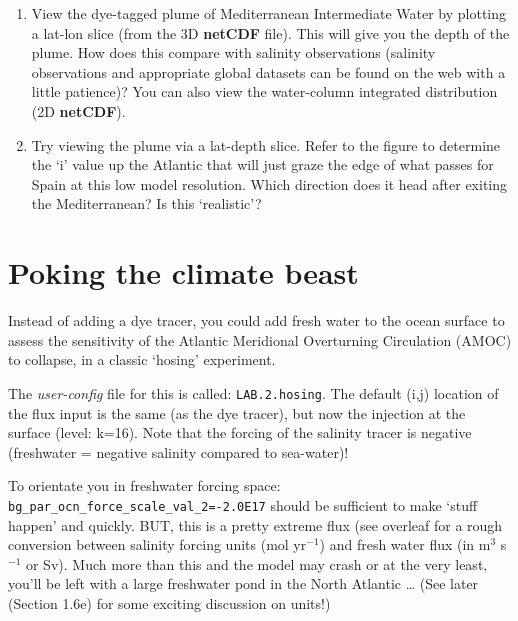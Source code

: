 \documentclass[11pt,fleqn]{book} %
\begin{document}
\vspace{1mm}
\begin{enumerate}[noitemsep]
\vspace{1mm}
\item View the dye-tagged plume of Mediterranean Intermediate Water by plotting a lat-lon slice (from the 3D \textbf{netCDF} file). This will give you the depth of the plume. How does this compare with salinity observations (salinity observations and appropriate global datasets can be found on the web with a little patience)? You can also view the water-column integrated distribution (2D \textbf{netCDF}).
\vspace{1mm}
\item Try viewing the plume via a lat-depth slice. Refer to the figure to determine the ‘i’ value up the Atlantic that will just graze the edge of what passes for Spain at this low model resolution. Which direction does it head after exiting the Mediterranean? Is this ‘realistic’?
\end{enumerate}
\vspace{1mm}


\newpage


\section{Poking the climate beast}

Instead of adding a dye tracer, you could add fresh water to the ocean surface to assess the sensitivity of the Atlantic Meridional Overturning Circulation (AMOC) to collapse, in a classic ‘hosing’ experiment.

The \textit{user-config} file for this is called: \texttt{LAB.2.hosing}. The default (i,j) location of the flux input is the same (as the dye tracer), but now the injection at the surface (level: k=16). Note that the forcing of the salinity tracer is negative (freshwater = negative salinity compared to sea-water)!

To orientate you in freshwater forcing space: \texttt{bg\_par\_ocn\_force\_scale\_val\_2=-2.0E17} should be sufficient to make ‘stuff happen’ and quickly. BUT, this is a pretty extreme flux (see overleaf for a rough conversion between salinity forcing units (mol yr$^{-1}$) and fresh water flux (in m$^{3}$ s$^{-1}$ or Sv). Much more than this and the model may crash or at the very least, you’ll be left with a large freshwater pond in the North Atlantic … (See later (Section 1.6e) for some exciting discussion on units!)
\end{document}
